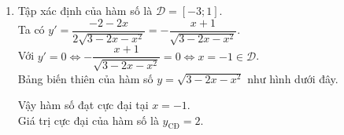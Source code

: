 \begin{vd}
{\begin{enumerate}
\begin{center}
            \end{center}
            Vậy hàm số đạt cực đại tại $x=-2$ và đạt cực tiểu tại $x=0$.\\
            Giá trị cực tiểu của hàm số là $y_{\text{CT}}=1$, giá trị cực đại của hàm số là $y_{\text{CĐ}}=-3$.
            \item
            Tập xác định của hàm số là $\mathscr{D}=[-3;1]$.\\
            Ta có $y'=\dfrac{-2-2x}{2\sqrt{3-2x-x^2}}=-\dfrac{x+1}{\sqrt{3-2x-x^2}}$.\\
            Với $y'=0\Leftrightarrow -\dfrac{x+1}{\sqrt{3-2x-x^2}}=0\Leftrightarrow x=-1\in\mathscr{D}$.\\
            Bảng biến thiên của hàm số $y=\sqrt{3-2x-x^2}$ như hình dưới đây.
            \begin{center}
            \end{center}
            Vậy hàm số đạt cực đại tại $x=-1$.\\
            Giá trị cực đại của hàm số là $y_{\text{CĐ}}=2$.
        \end{enumerate}
    }
\end{vd}
